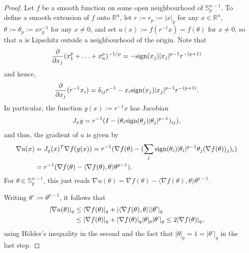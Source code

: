 \documentclass[a4paper,12pt]{amsart}
\numberwithin{equation}{section}
\theoremstyle{remark}
\def\R{{\mathbb R}}
\def\S{{\mathbb S}}
\def\sign{{\rm sign}}
\begin{document}
\begin{proof}
Let $f$ be a smooth function on some open neighbourhood of $\S_p^{n-1}$. To define a smooth extension of $f$ onto $\R^n$, let $r := r_p := \lvert x \rvert_p$ for any $x \in \R^n$, $\theta := \theta_p := xr_p^{-1}$ for any $x \ne 0$, and set $u(x) := f(r^{-1} x) = f(\theta)$ for $x \ne 0$, so that $u$ is Lipschitz outside a neighbourhood of the origin. Note that
\[
\frac{\partial}{\partial x_j} (x_1^p + \ldots + x_n^p)^{-1/p} = - \sign(x_j)|x_j|^{p-1} r^{-(p+1)}
\]
and hence,
\[
\frac{\partial}{\partial x_j} (r^{-1} x_i) = \delta_{ij} r^{-1} - x_i\sign(x_j)|x_j|^{p-1}r^{-(p+1)}.
\]
In particular, the function $g(x) := r^{-1} x$ has Jacobian
\[
J_xg = r^{-1}(I - (\theta_i \sign(\theta_j)|\theta_j|^{p-1})_{ij}),
\]
and thus, the gradient of $u$ is given by
\begin{align}
\nabla u(x) &= J_g(x)^T \nabla f(g(x)) = r^{-1}(\nabla f(\theta) - (\sum_j \sign(\theta_i)|\theta_i|^{p-1} \theta_j (\nabla f(\theta))_j)_i)\notag\\
&= r^{-1} (\nabla f(\theta) - \langle \nabla f(\theta), \theta \rangle \theta^{p-1}).\label{Repr1}
\end{align}
For $\theta \in \S_p^{n-1}$, this just reads $\nabla u(\theta) = \nabla f(\theta) - \langle \nabla f(\theta), \theta \rangle \theta^{p-1}$.

Writing $\theta' := \theta^{p-1}$, it follows that
\begin{align}
\lvert \nabla u(\theta) \rvert_q &\le \lvert \nabla f(\theta) \rvert_q + \lvert \langle \nabla f(\theta), \theta \rangle \rvert \lvert \theta' \rvert_q\notag\\
&\le \lvert \nabla f(\theta) \rvert_q + \lvert \nabla f(\theta) \rvert_q \lvert \theta \rvert_p \lvert \theta' \rvert_q \le 2 \lvert \nabla f(\theta) \rvert_q\label{finalEst},
\end{align}
using H\"{o}lder's inequality in the second and the fact that $\lvert \theta \rvert_p = 1 = \lvert \theta' \rvert_q$ in the last step.


\end{proof}
\end{document}
